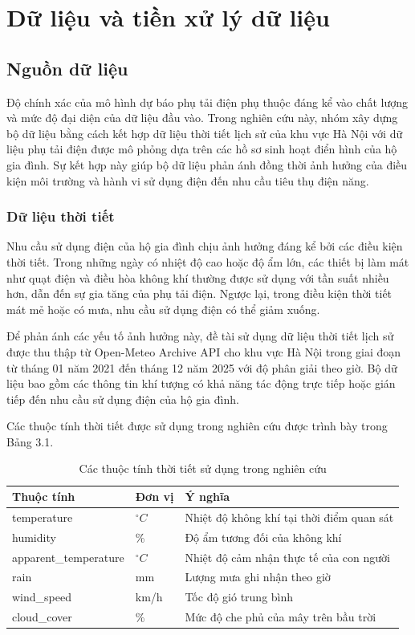 \chapter{Dữ liệu và tiền xử lý dữ liệu}

\section{Nguồn dữ liệu}

Độ chính xác của mô hình dự báo phụ tải điện phụ thuộc đáng kể vào chất lượng và mức độ đại diện của dữ liệu đầu vào. Trong nghiên cứu này, nhóm xây dựng bộ dữ liệu bằng cách kết hợp dữ liệu thời tiết lịch sử của khu vực Hà Nội với dữ liệu phụ tải điện được mô phỏng dựa trên các hồ sơ sinh hoạt điển hình của hộ gia đình. Sự kết hợp này giúp bộ dữ liệu phản ánh đồng thời ảnh hưởng của điều kiện môi trường và hành vi sử dụng điện đến nhu cầu tiêu thụ điện năng.

\subsection{Dữ liệu thời tiết}

Nhu cầu sử dụng điện của hộ gia đình chịu ảnh hưởng đáng kể bởi các điều kiện thời tiết. Trong những ngày có nhiệt độ cao hoặc độ ẩm lớn, các thiết bị làm mát như quạt điện và điều hòa không khí thường được sử dụng với tần suất nhiều hơn, dẫn đến sự gia tăng của phụ tải điện. Ngược lại, trong điều kiện thời tiết mát mẻ hoặc có mưa, nhu cầu sử dụng điện có thể giảm xuống.

Để phản ánh các yếu tố ảnh hưởng này, đề tài sử dụng dữ liệu thời tiết lịch sử được thu thập từ Open-Meteo Archive API cho khu vực Hà Nội trong giai đoạn từ tháng 01 năm 2021 đến tháng 12 năm 2025 với độ phân giải theo giờ. Bộ dữ liệu bao gồm các thông tin khí tượng có khả năng tác động trực tiếp hoặc gián tiếp đến nhu cầu sử dụng điện của hộ gia đình.

Các thuộc tính thời tiết được sử dụng trong nghiên cứu được trình bày trong Bảng 3.1.

\begin{table}[H]
\centering
\caption{Các thuộc tính thời tiết sử dụng trong nghiên cứu}
\begin{tabular}{|p{4cm}|p{2.5cm}|p{7cm}|}
\hline
\textbf{Thuộc tính} & \textbf{Đơn vị} & \textbf{Ý nghĩa} \\
\hline
temperature & $^\circ C$ & Nhiệt độ không khí tại thời điểm quan sát \\
\hline
humidity & \% & Độ ẩm tương đối của không khí \\
\hline
apparent\_temperature & $^\circ C$ & Nhiệt độ cảm nhận thực tế của con người \\
\hline
rain & mm & Lượng mưa ghi nhận theo giờ \\
\hline
wind\_speed & km/h & Tốc độ gió trung bình \\
\hline
cloud\_cover & \% & Mức độ che phủ của mây trên bầu trời \\
\hline
\end{tabular}
\end{table}

